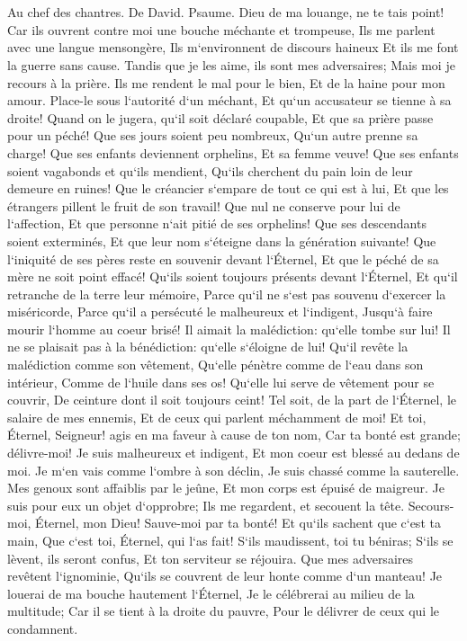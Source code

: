 \chapter{}

\verse Au chef des chantres. De David. Psaume. Dieu de ma louange, ne te tais point! 
\verse Car ils ouvrent contre moi une bouche méchante et trompeuse, Ils me parlent avec une langue mensongère, 
\verse Ils m`environnent de discours haineux Et ils me font la guerre sans cause. 
\verse Tandis que je les aime, ils sont mes adversaires; Mais moi je recours à la prière. 
\verse Ils me rendent le mal pour le bien, Et de la haine pour mon amour. 
\verse Place-le sous l`autorité d`un méchant, Et qu`un accusateur se tienne à sa droite! 
\verse Quand on le jugera, qu`il soit déclaré coupable, Et que sa prière passe pour un péché! 
\verse Que ses jours soient peu nombreux, Qu`un autre prenne sa charge! 
\verse Que ses enfants deviennent orphelins, Et sa femme veuve! 
\verse Que ses enfants soient vagabonds et qu`ils mendient, Qu`ils cherchent du pain loin de leur demeure en ruines! 
\verse Que le créancier s`empare de tout ce qui est à lui, Et que les étrangers pillent le fruit de son travail! 
\verse Que nul ne conserve pour lui de l`affection, Et que personne n`ait pitié de ses orphelins! 
\verse Que ses descendants soient exterminés, Et que leur nom s`éteigne dans la génération suivante! 
\verse Que l`iniquité de ses pères reste en souvenir devant l`Éternel, Et que le péché de sa mère ne soit point effacé! 
\verse Qu`ils soient toujours présents devant l`Éternel, Et qu`il retranche de la terre leur mémoire, 
\verse Parce qu`il ne s`est pas souvenu d`exercer la miséricorde, Parce qu`il a persécuté le malheureux et l`indigent, Jusqu`à faire mourir l`homme au coeur brisé! 
\verse Il aimait la malédiction: qu`elle tombe sur lui! Il ne se plaisait pas à la bénédiction: qu`elle s`éloigne de lui! 
\verse Qu`il revête la malédiction comme son vêtement, Qu`elle pénètre comme de l`eau dans son intérieur, Comme de l`huile dans ses os! 
\verse Qu`elle lui serve de vêtement pour se couvrir, De ceinture dont il soit toujours ceint! 
\verse Tel soit, de la part de l`Éternel, le salaire de mes ennemis, Et de ceux qui parlent méchamment de moi! 
\verse Et toi, Éternel, Seigneur! agis en ma faveur à cause de ton nom, Car ta bonté est grande; délivre-moi! 
\verse Je suis malheureux et indigent, Et mon coeur est blessé au dedans de moi. 
\verse Je m`en vais comme l`ombre à son déclin, Je suis chassé comme la sauterelle. 
\verse Mes genoux sont affaiblis par le jeûne, Et mon corps est épuisé de maigreur. 
\verse Je suis pour eux un objet d`opprobre; Ils me regardent, et secouent la tête. 
\verse Secours-moi, Éternel, mon Dieu! Sauve-moi par ta bonté! 
\verse Et qu`ils sachent que c`est ta main, Que c`est toi, Éternel, qui l`as fait! 
\verse S`ils maudissent, toi tu béniras; S`ils se lèvent, ils seront confus, Et ton serviteur se réjouira. 
\verse Que mes adversaires revêtent l`ignominie, Qu`ils se couvrent de leur honte comme d`un manteau! 
\verse Je louerai de ma bouche hautement l`Éternel, Je le célébrerai au milieu de la multitude; 
\verse Car il se tient à la droite du pauvre, Pour le délivrer de ceux qui le condamnent. 

